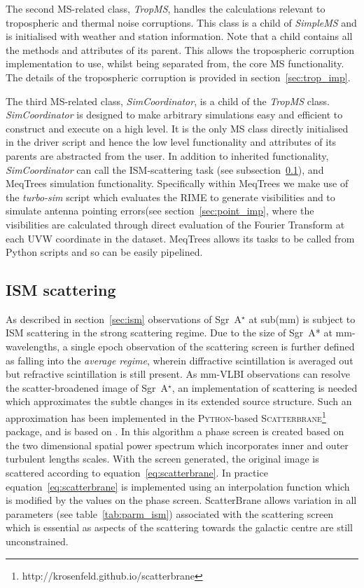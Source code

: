 The second MS-related class, \emph{TropMS}, handles the calculations relevant to tropospheric and thermal noise corruptions. This class is a child of {\it SimpleMS} and is initialised with weather and station information. Note that a child contains all the methods and attributes of its parent. This allows the tropospheric corruption implementation to use, whilst being separated from, the core MS functionality. The details of the tropospheric corruption is provided in section~\ref{sec:trop_imp}. 

The third MS-related class, \emph{SimCoordinator}, is a child of the {\it TropMS} class. {\it SimCoordinator} is designed to make arbitrary simulations easy and efficient to construct and execute on a high level. It is the only MS class directly initialised in the driver script and hence the low level functionality and attributes of its parents are abstracted from the user. In addition to inherited functionality, {\it SimCoordinator} can call the ISM-scattering task (see subsection~\ref{sec:ism_imp}), and {\sc MeqTrees} simulation functionality.
Specifically within {\sc MeqTrees} we make use of the {\it turbo-sim} script which evaluates the RIME to generate visibilities and to simulate antenna pointing errors(see section~\ref{sec:point_imp}, where the visibilities are calculated through direct evaluation of the Fourier Transform at each UVW coordinate in the dataset. {\sc MeqTrees} allows its tasks to be called from {\sc Python} scripts and so can be easily pipelined.
 

\subsection{ISM scattering}\label{sec:ism_imp}

As described in section~\ref{sec:ism} observations of Sgr~A$^\star$ at sub(mm) is subject to ISM scattering in the strong scattering regime. Due to the size of Sgr~A* at mm-wavelengths, a single epoch observation of the scattering screen is further defined as falling into the \emph{average regime}, wherein diffractive scintillation is averaged out but refractive scintillation is still present. As mm-VLBI observations can resolve the scatter-broadened image of Sgr~A$^\star$, an implementation of scattering is needed which approximates the subtle changes in its extended source structure. Such an approximation has been implemented in the \textsc{Python}-based \textsc{Scatterbrane}\footnote{http://krosenfeld.github.io/scatterbrane} package, and is based on \citet*{Johnson_2015a}. In this algorithm a phase screen is created based on the two dimensional spatial power spectrum  \citep*[see][Appendix C]{Johnson_2015a} which incorporates inner and outer turbulent lengths scales. With the screen generated, the original image is scattered according to equation~\ref{eq:scatterbrane}. In practice equation~\ref{eq:scatterbrane} is implemented using an interpolation function which is modified by the values on the phase screen. {\sc ScatterBrane} allows variation in all parameters (see table~\ref{tab:parm_ism}) associated with the scattering screen which is essential as aspects of the scattering towards the galactic centre are still unconstrained.

